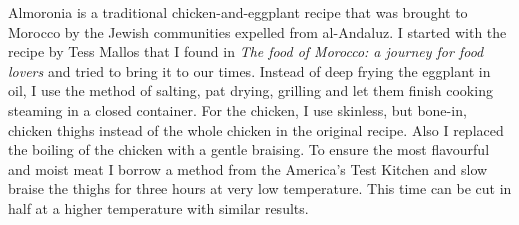 \documentclass[11pt,letterpaper]{article}
\begin{document}


Almoronia is a traditional chicken-and-eggplant recipe that was brought to Morocco by the Jewish communities expelled from al-Andaluz. I started with the recipe by Tess Mallos that I found in {\it The food of Morocco: a journey for food lovers} and tried to bring it to our times. Instead of deep frying the eggplant in oil, I use the method of salting, pat drying, grilling and let them finish cooking steaming in a closed container. For the chicken, I use skinless, but bone-in, chicken thighs instead of the whole chicken in the original recipe. Also I replaced the boiling of the chicken with a gentle braising. To ensure the most flavourful and moist meat I borrow a method from the America's Test Kitchen and slow braise the thighs for three hours at very low temperature. This time can be cut in half at a higher temperature with similar results.
\end{document}
